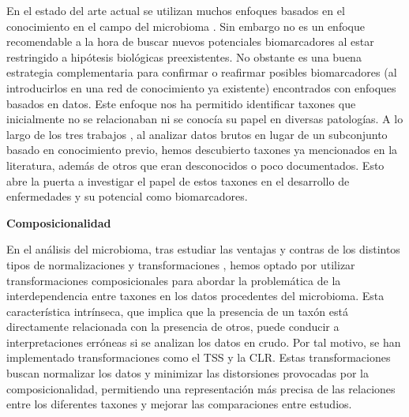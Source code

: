 En el estado del arte actual se utilizan muchos enfoques basados en el conocimiento en el campo del microbioma \cite{chong2017computational, bauer2018network,  luo2024progress}. Sin embargo no es un enfoque recomendable a la hora de buscar nuevos potenciales biomarcadores al estar restringido a hipótesis biológicas preexistentes. No obstante es una buena estrategia complementaria para confirmar o reafirmar posibles biomarcadores (al introducirlos en una red de conocimiento ya existente) encontrados con enfoques basados en datos. Este enfoque nos ha permitido identificar taxones que inicialmente no se relacionaban ni se conocía su papel en diversas patologías. A lo largo de los tres trabajos \cite{paper1, paper2, paper3}, al analizar datos brutos en lugar de un subconjunto basado en conocimiento previo, hemos descubierto taxones ya mencionados en la literatura, además de otros que eran desconocidos o poco documentados. Esto abre la puerta a investigar el papel de estos taxones en el desarrollo de enfermedades y su potencial como biomarcadores.

\textbf{Composicionalidad}

En el análisis del microbioma, tras estudiar las ventajas y contras de los distintos tipos de normalizaciones y transformaciones \cite{gloor2016compositional, gloor2017microbiome, hong2022rarefy}, hemos optado por utilizar transformaciones composicionales para abordar la problemática de la interdependencia entre taxones en los datos procedentes del microbioma. Esta característica intrínseca, que implica que la presencia de un taxón está directamente relacionada con la presencia de otros, puede conducir a interpretaciones erróneas si se analizan los datos en crudo. Por tal motivo, se han implementado transformaciones como el TSS y la CLR. Estas transformaciones buscan normalizar los datos y minimizar las distorsiones provocadas por la composicionalidad, permitiendo una representación más precisa de las relaciones entre los diferentes taxones y mejorar las comparaciones entre estudios. 

